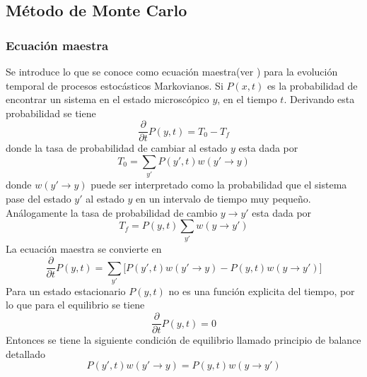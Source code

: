 \documentclass[a4paper]{article}
\begin{document}
\subsection{Método de Monte Carlo}
\subsubsection{Ecuación maestra}
Se introduce lo que se conoce como ecuación maestra(ver \cite{Silvio}) para la evolución temporal de procesos estocásticos Markovianos. Si $P(x,t)$ es la probabilidad de encontrar un sistema en el estado microscópico $y$, en el tiempo $t$. Derivando esta probabilidad se tiene
\begin{equation}
\frac{\partial}{\partial t}P(y,t)=T_0-T_f
\end{equation}
donde la tasa de probabilidad de cambiar al estado $y$ esta dada por
\begin{equation}
T_0=\sum_{y'}P(y',t)w(y'\rightarrow y)
\end{equation}
donde $w(y'\rightarrow y)$ puede ser interpretado como la probabilidad que el sistema pase del estado $y'$ al estado $y$ en un intervalo de tiempo muy pequeño. Análogamente la tasa de probabilidad de cambio $y\rightarrow y'$ esta dada por
\begin{equation}
T_f=P(y,t)\sum_{y'}w(y\rightarrow y')
\end{equation}
La ecuación maestra se convierte en 
\begin{equation}\label{masterEq}
\frac{\partial}{\partial t}P(y,t)=\sum_{y'}\Big[P(y',t)w(y'\rightarrow y)-P(y,t)w(y\rightarrow y')\Big]
\end{equation}
Para un estado estacionario $P(y,t)$ no es una función explicita del tiempo, por lo que para el equilibrio se tiene
\begin{equation}
\frac{\partial}{\partial t}P(y,t)=0
\end{equation}
Entonces se tiene la siguiente condición de equilibrio llamado principio de balance detallado
\begin{equation}\label{equi}
P(y',t)w(y'\rightarrow y)=P(y,t)w(y\rightarrow y')
\end{equation}
\end{document}
